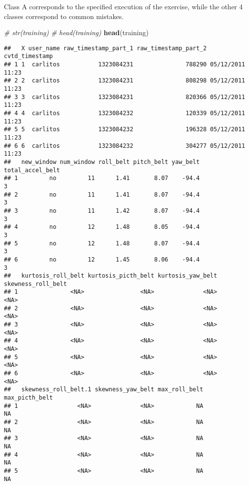 \documentclass[
]{article}
\newenvironment{Shaded}{\begin{snugshade}}{\end{snugshade}}
\newcommand{\CommentTok}[1]{\textcolor[rgb]{0.56,0.35,0.01}{\textit{#1}}}
\newcommand{\KeywordTok}[1]{\textcolor[rgb]{0.13,0.29,0.53}{\textbf{#1}}}
\newcommand{\NormalTok}[1]{#1}
\begin{document}
Class A corresponds to the specified execution of the exercise, while
the other 4 classes correspond to common mistakes.

\begin{Shaded}
\begin{Highlighting}[]
\CommentTok{# str(training)}
\CommentTok{# head(training)}
\KeywordTok{head}\NormalTok{(training)}
\end{Highlighting}
\end{Shaded}

\begin{verbatim}
##   X user_name raw_timestamp_part_1 raw_timestamp_part_2   cvtd_timestamp
## 1 1  carlitos           1323084231               788290 05/12/2011 11:23
## 2 2  carlitos           1323084231               808298 05/12/2011 11:23
## 3 3  carlitos           1323084231               820366 05/12/2011 11:23
## 4 4  carlitos           1323084232               120339 05/12/2011 11:23
## 5 5  carlitos           1323084232               196328 05/12/2011 11:23
## 6 6  carlitos           1323084232               304277 05/12/2011 11:23
##   new_window num_window roll_belt pitch_belt yaw_belt total_accel_belt
## 1         no         11      1.41       8.07    -94.4                3
## 2         no         11      1.41       8.07    -94.4                3
## 3         no         11      1.42       8.07    -94.4                3
## 4         no         12      1.48       8.05    -94.4                3
## 5         no         12      1.48       8.07    -94.4                3
## 6         no         12      1.45       8.06    -94.4                3
##   kurtosis_roll_belt kurtosis_picth_belt kurtosis_yaw_belt skewness_roll_belt
## 1               <NA>                <NA>              <NA>               <NA>
## 2               <NA>                <NA>              <NA>               <NA>
## 3               <NA>                <NA>              <NA>               <NA>
## 4               <NA>                <NA>              <NA>               <NA>
## 5               <NA>                <NA>              <NA>               <NA>
## 6               <NA>                <NA>              <NA>               <NA>
##   skewness_roll_belt.1 skewness_yaw_belt max_roll_belt max_picth_belt
## 1                 <NA>              <NA>            NA             NA
## 2                 <NA>              <NA>            NA             NA
## 3                 <NA>              <NA>            NA             NA
## 4                 <NA>              <NA>            NA             NA
## 5                 <NA>              <NA>            NA             NA

\end{verbatim}
\end{document}
